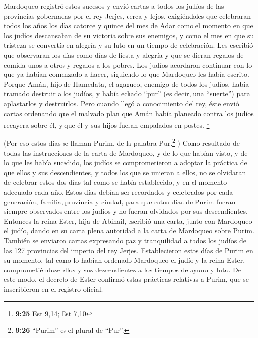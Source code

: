  Mardoqueo registró estos sucesos y envió cartas a todos
los judíos de las provincias gobernadas por el rey Jerjes, cerca y
lejos,  exigiéndoles que celebraran todos los años los
días catorce y quince del mes de Adar  como el momento en
que los judíos descansaban de su victoria sobre sus enemigos, y como el
mes en que su tristeza se convertía en alegría y su luto en un tiempo de
celebración. Les escribió que observaran los días como días de fiesta y
alegría y que se dieran regalos de comida unos a otros y regalos a los
pobres.  Los judíos acordaron continuar con lo que ya
habían comenzado a hacer, siguiendo lo que Mardoqueo les había escrito.
 Porque Amán, hijo de Hamedata, el agagueo, enemigo de
todos los judíos, había tramado destruir a los judíos, y había echado
``pur'' (es decir, una ``suerte'') para aplastarlos y destruirlos.
 Pero cuando llegó a conocimiento del rey, éste envió
cartas ordenando que el malvado plan que Amán había planeado contra los
judíos recayera sobre él, y que él y sus hijos fueran empalados en
postes. \footnote{\textbf{9:25} Est 9,14; Est 7,10}

 (Por eso estos días se llaman Purim, de la palabra
Pur.\footnote{\textbf{9:26} ``Purim'' es el plural de ``Pur''.} ) Como
resultado de todas las instrucciones de la carta de Mardoqueo, y de lo
que habían visto, y de lo que les había sucedido,  los
judíos se comprometieron a adoptar la práctica de que ellos y sus
descendientes, y todos los que se unieran a ellos, no se olvidaran de
celebrar estos dos días tal como se había establecido, y en el momento
adecuado cada año.  Estos días debían ser recordados y
celebrados por cada generación, familia, provincia y ciudad, para que
estos días de Purim fueran siempre observados entre los judíos y no
fueran olvidados por sus descendientes.  Entonces la
reina Ester, hija de Abihail, escribió una carta, junto con Mardoqueo el
judío, dando en su carta plena autoridad a la carta de Mardoqueo sobre
Purim.  También se enviaron cartas expresando paz y
tranquilidad a todos los judíos de las 127 provincias del imperio del
rey Jerjes.  Establecieron estos días de Purim en su
momento, tal como lo habían ordenado Mardoqueo el judío y la reina
Ester, comprometiéndose ellos y sus descendientes a los tiempos de ayuno
y luto.  De este modo, el decreto de Ester confirmó estas
prácticas relativas a Purim, que se inscribieron en el registro oficial.

